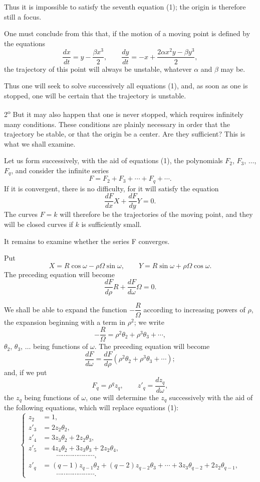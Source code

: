 \documentclass[11pt]{article}
\begin{document}
Thus it is impossible to satisfy the seventh equation (1); the origin is therefore still a focus.

One must conclude from this that, if the motion of a moving point is defined by the equations
\[
\frac{dx}{dt}=y-\frac{\beta x^3}{2},
\qquad
\frac{dy}{dt}=-x+\frac{2\alpha x^2y-\beta y^3}{2},
\]
the trajectory of this point will always be unstable, whatever $\alpha$ and $\beta$ may be.

Thus one will seek to solve successively all equations (1), and, as soon as one is stopped, one will be certain that the trajectory is unstable.

2\textsuperscript{o} But it may also happen that one is never stopped, which requires infinitely many conditions. These conditions are plainly necessary in order that the trajectory be stable, or that the origin be a center. Are they sufficient? This is what we shall examine.

Let us form successively, with the aid of equations (1), the polynomials $F_2$, $F_3$, $\ldots$, $F_q$, and consider the infinite series
\[
F=F_2+F_3+\cdots+F_q+\cdots.
\]
If it is convergent, there is no difficulty, for it will satisfy the equation
\[
\frac{dF}{dx}X+\frac{dF}{dy}Y=0.
\]
The curves $F=k$ will therefore be the trajectories of the moving point, and they will be closed curves if $k$ is sufficiently small.

It remains to examine whether the series F converges.

Put
\[
X=R\cos\omega-\rho\Omega\sin\omega,
\qquad
Y=R\sin\omega+\rho\Omega\cos\omega.
\]
The preceding equation will become
\[
\frac{dF}{d\rho}R+\frac{dF}{d\omega}\Omega=0.
\]

We shall be able to expand the function $-\dfrac{R}{\Omega}$ according to increasing powers of $\rho$, the expansion beginning with a term in $\rho^2$; we write
\[
-\frac{R}{\Omega}=\rho^2\theta_2+\rho^3\theta_3+\cdots,
\]
$\theta_2$, $\theta_3$, $\ldots$ being functions of $\omega$. The preceding equation will become
\[
\frac{dF}{d\omega}=\frac{dF}{d\rho}(\rho^2\theta_2+\rho^3\theta_3+\cdots);
\]
and, if we put
\[
F_q=\rho^qz_q,
\qquad
z'_q=\frac{dz_q}{d\omega},
\]
the $z_q$ being functions of $\omega$, one will determine the $z_q$ successively with the aid of the following equations, which will replace equations (1):
\begin{equation}\tag{1 bis}
\left\{
\begin{aligned}
z_2&=1,\\
z'_3&=2z_2\theta_2,\\
z'_4&=3z_3\theta_2+2z_2\theta_3,\\
z'_5&=4z_4\theta_2+3z_3\theta_3+2z_2\theta_4,\\
&\hspace{2em}\cdots\cdots\cdots\cdots\cdots\cdots\cdots,\\
z'_q&=(q-1)z_{q-1}\theta_2+(q-2)z_{q-2}\theta_3+\cdots+3z_3\theta_{q-2}+2z_2\theta_{q-1},\\
&\hspace{2em}\cdots\cdots\cdots\cdots\cdots\cdots\cdots.
\end{aligned}
\right.
\end{equation}
\end{document}
